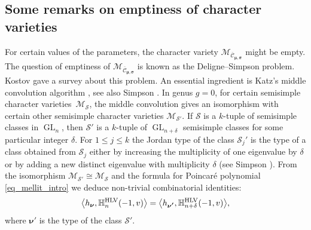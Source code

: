 \documentclass[JEP,XML,SOM,NoEqCountersInSection,Unicode,published]{cedram}
\newcommand{\HLV}{\textup{HLV}}
\newcommand{\blangle}{\bigl\langle}
\newcommand{\brangle}{\bigr\rangle}
\theoremstyle{definition}
\theoremstyle{plain}
\DeclareMathOperator{\GL}{GL}
\newcommand{\mcmus}{\mathcal{M}_{\overline{\mathcal{C}}_{\boldsymbol{\mu},\boldsymbol{\sigma}}}}
\begin{document}
\subsection{Some remarks on emptiness of character varieties}\label{subsect_emptiness}
For certain values of the parameters, the character variety $\mcmus$ might be empty. The question of emptiness of $\mcmus$ is known as the Deligne--Simpson problem. Kostov \cite{Kostov04} gave a survey about this problem. An essential ingredient is Katz's middle convolution algorithm \cite{Katz96}, see also Simpson \cite{Simpson_middle_convolution}. In genus $g=0$, for certain semisimple character varieties~$\mathcal{M}_{\boldsymbol{\mathcal{S}}}$, the middle convolution gives an isomorphism with certain other semisimple character varieties $\mathcal{M}_{\boldsymbol{\mathcal{S}'}}$. If $\boldsymbol{\mathcal{S}}$ is a $k$-tuple of semisimple classes in $\GL_n$, then $\boldsymbol{\mathcal{S}'}$ is a $k$-tuple of $\GL_{n+\delta}$ semisimple classes for some particular integer $\delta$. For $1\le j \le k$ the Jordan type of the class $\mathcal{S}_j'$ is the type of a class obtained from $\mathcal{S}_j$ either by increasing the multiplicity of one eigenvalue by $\delta$ or by adding a new distinct eigenvalue with multiplicity $\delta$ (see Simpson \cite[\S 4]{Simpson_middle_convolution}). From the isomorphism $\mathcal{M}_{\boldsymbol{\mathcal{S}'}}\cong \mathcal{M}_{\boldsymbol{\mathcal{S}}}$ and the formula for Poincaré polynomial \eqref{eq_mellit_intro} we deduce non-trivial combinatorial identities:\enlargethispage{\baselineskip}%
\[
\blangle h_{\boldsymbol{\nu}},\mathbb{H}_n^{\HLV}(-1,v)\brangle =\blangle h_{\boldsymbol{\nu'}},\mathbb{H}_{n+\delta}^{\HLV}(-1,v)\brangle,
\]
where $\boldsymbol{\nu}'$ is the type of the class $\boldsymbol{\mathcal{S}'}$.
\end{document}
